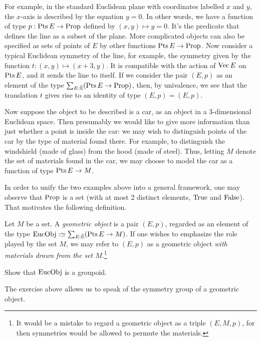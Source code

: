 For example, in the standard Euclidean plane with coordinates labelled $x$ and
$y$, the $x$-axis is described by the equation $y=0$.  In other words, we have
a function of type $p : \Points E \to \Prop$ defined by $(x,y) \mapsto y=0$.
It's the predicate that defines the line as a subset of the plane.  More
complicated objects can also be specified as sets of points of $E$ by other
functions $\Points E \to \Prop$.  Now consider a typical Euclidean symmetry of
the line, for example, the symmetry given by the function $t : (x,y) \mapsto (x+3,y)$.
It is compatible with the action of $\Vectors E$ on $\Points E$, and it sends
the line to itself.  If we consider the pair $(E,p)$ as an element of the type
$\sum_{E:\ES} (\Points E \to \Prop)$, then, by univalence, we see that the
translation $t$ gives rise to an identity of type $(E,p) = (E,p)$.

Now suppose the object to be described is a car, as an object in a
3-dimensional Euclidean space.  Then presumably we would like to give more
information than just whether a point is inside the car: we may wish to
distinguish points of the car by the type of material found there.  For
example, to distinguish the windshield (made of glass) from the hood (made of
steel).  Thus, letting $M$ denote the set of materials found in the car, we may
choose to model the car as a function of type $\Points E \to M$.

In order to unify the two examples above into a general framework, one may
observe that $\mathrm{Prop}$ is a set (with at most 2 distinct elements, $\mathrm{True}$ and
$\mathrm{False}$).  That motivates the following definition.

\begin{definition}
  Let $M$ be a set.  A {\em geometric object} is a pair $(E,p)$, regarded as an
  element of the type $\EucObj \defeq \sum_{E:\ES} (\Points E \to M)$.  If one
  wishes to emphasize the role played by the set $M$, we may refer to $(E,p)$
  as a geometric object {\em with materials drawn from the set
    $M$}.\footnote{It would be a mistake to regard a geometric object as a
    triple $(E,M,p)$, for then symmetries would be allowed to permute the
    materials.}
\end{definition}

\begin{exercise}
  Show that $\EucObj$ is a groupoid.
\end{exercise}

The exercise above allows us to speak of the symmetry group of a geometric object.

